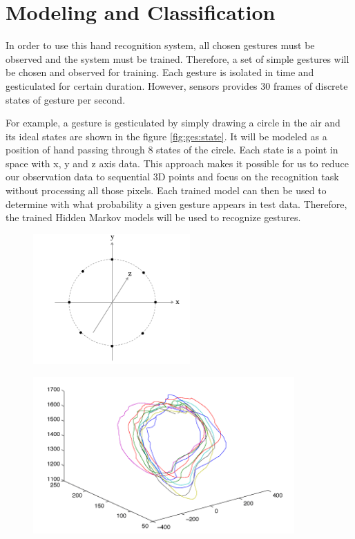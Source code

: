 \section{Modeling and Classification}
In order to use this hand recognition system, all chosen gestures must be observed and the system must be trained. Therefore, a set of simple gestures will be chosen and observed for training. Each gesture is isolated in time and gesticulated for certain duration. However, sensors provides 30 frames of discrete states of gesture per second. 

For example, a gesture is gesticulated by simply drawing a circle in the air and its ideal states are shown in the figure \ref{fig:ges:state}. It will be modeled as a position of hand passing through 8 states of the circle. Each state is a point in space with x, y and z axis data. This approach makes it possible for us to reduce our observation data to sequential 3D points and focus on the recognition task without processing all those pixels. Each trained model can then be used to determine with what probability a given gesture appears in test data. Therefore, the trained Hidden Markov models will be used to recognize gestures. 

\begin{figure}
	\centering
	\begin{minipage}{.3\textwidth}
		\centering
		\includegraphics[width=6cm]{figures/ges-states.png}
		\label{fig:ges:state}
	\end{minipage}%
	\begin{minipage}{.7\textwidth}
		\centering
		\includegraphics[width=10cm]{figures/ges-train.png}
		\label{fig:ges:train}
	\end{minipage}
\end{figure}

